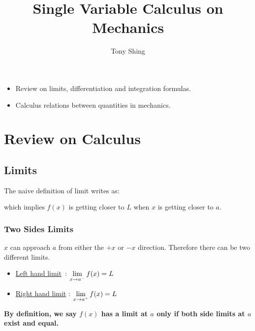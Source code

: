 \documentclass[class=article, crop=false, 12pt]{standalone}
\author{Tony Shing}
\title{Single Variable Calculus on Mechanics}
\begin{document}
\maketitle


\begin{overview}
    \begin{itemize}
        \item Review on limits, differentiation and integration formulas. 
        \item Calculus relations between quantities in mechanics.
    \end{itemize}
\end{overview}


\section{Review on Calculus}

\subsection{Limits}
The naive definition of limit writes as:


which implies $f(x)$ is getting closer to $L$ when $x$ is getting closer to $a$.


\subsubsection{Two Sides Limits}

$x$ can approach $a$ from either the $+x$ or $-x$ direction. 
Therefore there can be two different limits.

\begin{itemize}
    \item \underline{Left hand limit}\ : $\displaystyle \lim_{x\to a^{\color{red}{-}}} f(x) = L$
    \item \underline{Right hand limit} : $\displaystyle \lim_{x\to a^{\color{red}{+}}} f(x) = L$
\end{itemize}

\bf{By definition}, we say $f(x)$ has a limit at $a$ only if \bf{both side limits at $a$ exist and equal}.
\end{document}
